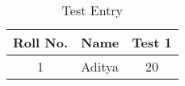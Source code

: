 \documentclass[12pt,a4paper,final,twoside]{report}
\begin{document}
\begin{table}
	
	\begin{center}
		\begin{tabular}{|c|c|c|}
			\hline Roll No. & Name & Test 1 \\ 
			\hline 1 & Aditya & 20 \\ 
			\hline 
		\end{tabular} 
		
		
	\end{center}
	
	\caption{Test Entry}
\end{table}
\end{document}
